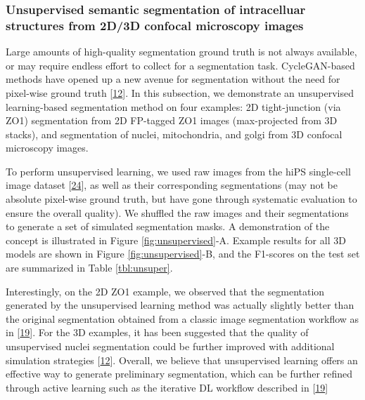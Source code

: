 \hypertarget{unsupervised-semantic-segmentation-of-intracelluar-structures-from-2d3d-confocal-microscopy-images}{%
\subsubsection{Unsupervised semantic segmentation of intracelluar structures from 2D/3D confocal microscopy images}\label{unsupervised-semantic-segmentation-of-intracelluar-structures-from-2d3d-confocal-microscopy-images}}

Large amounts of high-quality segmentation ground truth is not always available, or may require endless effort to collect for a segmentation task. CycleGAN-based methods have opened up a new avenue for segmentation without the need for pixel-wise ground truth {[}\protect\hyperlink{ref-RuFP3CS3}{12}{]}. In this subsection, we demonstrate an unsupervised learning-based segmentation method on four examples: 2D tight-junction (via ZO1) segmentation from 2D FP-tagged ZO1 images (max-projected from 3D stacks), and segmentation of nuclei, mitochondria, and golgi from 3D confocal microscopy images.

To perform unsupervised learning, we used raw images from the hiPS single-cell image dataset {[}\protect\hyperlink{ref-5sGcmDuy}{24}{]}, as well as their corresponding segmentations (may not be absolute pixel-wise ground truth, but have gone through systematic evaluation to ensure the overall quality). We shuffled the raw images and their segmentations to generate a set of simulated segmentation masks. A demonstration of the concept is illustrated in Figure \ref{fig:unsupervised}-A. Example results for all 3D models are shown in Figure \ref{fig:unsupervised}-B, and the F1-scores on the test set are summarized in Table \ref{tbl:unsuper}.

Interestingly, on the 2D ZO1 example, we observed that the segmentation generated by the unsupervised learning method was actually slightly better than the original segmentation obtained from a classic image segmentation workflow as in {[}\protect\hyperlink{ref-jM3v1UjQ}{19}{]}. For the 3D examples, it has been suggested that the quality of unsupervised nuclei segmentation could be further improved with additional simulation strategies {[}\protect\hyperlink{ref-RuFP3CS3}{12}{]}. Overall, we believe that unsupervised learning offers an effective way to generate preliminary segmentation, which can be further refined through active learning such as the iterative DL workflow described in {[}\protect\hyperlink{ref-jM3v1UjQ}{19}{]}

